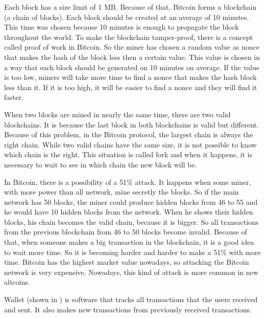 
Each block has a size limit of 1 MB.
Because of that, Bitcoin forms a blockchain (a chain of blocks).
Each block should be created at an average of 10 minutes.
This time was chosen because 10 minutes is enough to propagate the block throughout the world.
To make the blockchain tamper-proof, there is a concept called proof of work in Bitcoin.
So the miner has chosen a random value as nonce that makes the hash of the block less
then a certain value.
This value is chosen in a way that each block should be generated on 10 minutes on average.
If the value is too low, miners will take more time to find a nonce that makes the hash block
less than it.
If it is too high, it will be easier to find a nonce and they will find it faster.

When two blocks are mined in nearly the same time, there are two valid blockchains.
It is because the last block in both blockchains is valid but different.
Because of this problem, in the Bitcoin protocol, the largest chain is always the right chain.
While two valid chains have the same size, it is not possible to know which chain is the right.
This situation is called fork and when it happens, it is necessary to wait to see in which chain
the new block will be.

In Bitcoin, there is a possibility of a 51\% attack.
It happens when some miner, with more power than all network, mine secretly the blocks.
So if the main network has 50 blocks, the miner could produce hidden blocks from 46 to 55
and he would have 10 hidden blocks from the network.
When he shows their hidden blocks, his chain becomes the valid chain, because it is bigger.
So all transactions from the previous blockchain from 46 to 50 blocks become invalid.
Because of that, when someone makes a big transaction in the blockchain, it is a good idea
to wait more time.
So it is becoming harder and harder to make a 51\% with more time.
Bitcoin has the highest market value nowadays, so attacking the Bitcoin network is very expensive.
Nowadays, this kind of attack is more common in new altcoins.


Wallet (shown in ) is software that tracks all transactions 
that the users received and sent.
It also makes new transactions from previously received transactions.

